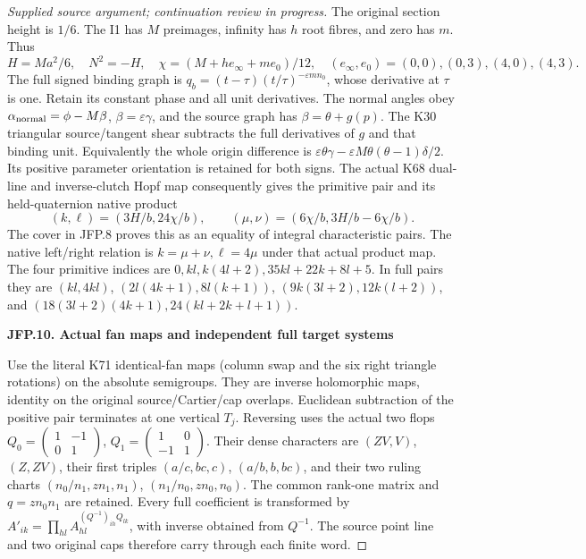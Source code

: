 \begin{proof}[Supplied source argument; continuation review in progress]
The original section height is \(1/6\). The I1 has \(M\)
preimages, infinity has \(h\) root fibres, and zero has \(m\).
Thus
\[
 H=Ma^2/6,\quad N^2=-H,\quad
 \chi=(M+h e_\infty+m e_0)/12,
 \quad(e_\infty,e_0)=(0,0),(0,3),(4,0),(4,3).
\tag{JFP.39}
\]
The full signed binding graph is
\(q_b=(t-\tau)(t/\tau)^{-\varepsilon mn_0}\), whose
derivative at \(\tau\) is one. Retain its constant phase
and all unit derivatives. The normal angles obey
\(\alpha_{\rm normal}=\phi-M\beta\), \(\beta=\varepsilon\gamma\),
and the source graph has \(\beta=\theta+g(p)\).
The K30 triangular source/tangent shear subtracts the full
derivatives of \(g\) and that binding unit. Equivalently the
whole origin difference is
\(\varepsilon\theta\gamma-\varepsilon M\theta(\theta-1)\delta/2\).
Its positive parameter orientation is retained for both signs.
The actual K68 dual-line and inverse-clutch Hopf map consequently
gives the primitive pair and its held-quaternion native product
\[
 (k,\ell)=(3H/b,24\chi/b),\qquad
 (\mu,\nu)=(6\chi/b,3H/b-6\chi/b).
\tag{JFP.40}
\]
The cover in JFP.8 proves this as an equality of integral
characteristic pairs. The native left/right relation is
\(k=\mu+\nu,\ell=4\mu\) under that actual product map.
The four primitive indices are
\(0,kl,k(4l+2),35kl+22k+8l+5\). In full pairs they are
\((kl,4kl)\), \((2l(4k+1),8l(k+1))\),
\((9k(3l+2),12k(l+2))\), and
\((18(3l+2)(4k+1),24(kl+2k+l+1))\).

\par

\medskip\noindent\textbf{JFP.10. Actual fan maps and independent full target systems}

\par\nobreak

Use the literal K71 identical-fan maps (column swap and the
six right triangle rotations) on the absolute semigroups.
They are inverse holomorphic maps, identity on the original
source/Cartier/cap overlaps. Euclidean subtraction of the
positive pair terminates at one vertical \(T_j\). Reversing
uses the actual two flops
\(Q_0=\left(\begin{smallmatrix}1&-1\\0&1\end{smallmatrix}\right)\),
\(Q_1=\left(\begin{smallmatrix}1&0\\-1&1\end{smallmatrix}\right)\).
Their dense characters are \((ZV,V)\), \((Z,ZV)\), their
first triples \((a/c,bc,c)\), \((a/b,b,bc)\), and their
two ruling charts
\((n_0/n_1,zn_1,n_1)\), \((n_1/n_0,zn_0,n_0)\).
The common rank-one matrix and \(q=zn_0n_1\) are retained.
Every full coefficient is transformed by
\(A'_{ik}=\prod_{hl}A_{hl}^{(Q^{-1})_{ih}Q_{lk}}\), with
inverse obtained from \(Q^{-1}\). The source point line and
two original caps therefore carry through each finite word.


\end{proof}
